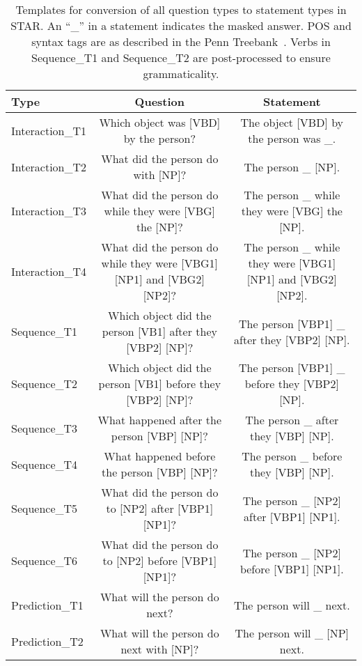 \begin{landscape}
\begin{table}[t]
    \centering
    \caption{Templates for conversion of all question types to statement types
        in STAR. An ``\_'' in a statement indicates the masked answer.  POS and
        syntax tags are as described in the Penn
        Treebank~\cite{marcus1993penntreebank}. Verbs in Sequence\_T1 and
        Sequence\_T2 are post-processed to ensure grammaticality.}
    \label{tab:qs_to_stmts}
    \scriptsize
    \begin{tabular}{lcc}
        \toprule
        Type & Question & Statement \\
        \midrule
        Interaction\_T1 & Which object was [VBD] by the person? & The object [VBD] by the person was \_. \\
        Interaction\_T2 & What did the person do with [NP]? & The person \_ [NP]. \\
        Interaction\_T3 & What did the person do while they were [VBG] the [NP]? & The person \_ while they were [VBG] the [NP]. \\
        Interaction\_T4 & What did the person do while they were [VBG1] [NP1] and [VBG2] [NP2]? & The person \_ while they were [VBG1] [NP1] and [VBG2] [NP2]. \\
        \midrule
        Sequence\_T1 & Which object did the person [VB1] after they [VBP2] [NP]? & The person [VBP1] \_ after they [VBP2] [NP]. \\
        Sequence\_T2 & Which object did the person [VB1] before they [VBP2] [NP]? & The person [VBP1] \_ before they [VBP2] [NP]. \\
        Sequence\_T3 & What happened after the person [VBP] [NP]? & The person \_ after they [VBP] [NP]. \\
        Sequence\_T4 & What happened before the person [VBP] [NP]? & The person \_ before they [VBP] [NP]. \\
        Sequence\_T5 & What did the person do to [NP2] after [VBP1] [NP1]? & The person \_ [NP2] after [VBP1] [NP1]. \\
        Sequence\_T6 & What did the person do to [NP2] before [VBP1] [NP1]? & The person \_ [NP2] before [VBP1] [NP1]. \\
        \midrule
        Prediction\_T1 & What will the person do next? & The person will \_ next. \\
        Prediction\_T2 & What will the person do next with [NP]? & The person will \_ [NP] next. \\

\end{tabular}
\end{table}
\end{landscape}
